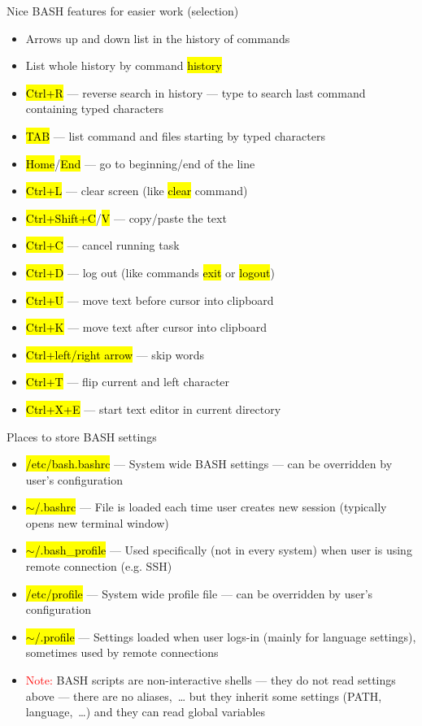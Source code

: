 \documentclass[compress, ucs, xelatex, 11pt, xcolor=svgnames,
  hyperref={
    bookmarks=true,
    unicode=true,
    colorlinks=true,
    pdftitle={Linux, command line and MetaCentrum},
    plainpages=false,
    pdfauthor={Vojtech Zeisek},
    pdfsubject={Course about use of Linux command line, writing shell scripts and using MetaCentrum of CESNET},
    pdfcreator={XeLaTeX},
    pdfkeywords={Linux, GNU, BASH, shell, command line, MetaCentrum},
    linkcolor=DarkRed,
    anchorcolor=DarkBlue,
    citecolor=Indigo,
    filecolor=NavyBlue,
    menucolor=DarkMagenta,
    urlcolor=DarkBlue,
    pdftex},
  url={hyphens, lowtilde} %
  ]{beamer}
\renewcommand{\texttt}[1]{\hl{\ttfamily #1}}
\renewcommand{\alert}[1]{\textcolor{red}{#1}}
\begin{document}
\begin{frame}{Nice BASH features for easier work (selection)}
  \begin{itemize}
    \item Arrows up and down list in the history of commands
    \item List whole history by command \texttt{history}
    \item \texttt{Ctrl+R} --- reverse search in history --- type to search last command containing typed characters
    \item \texttt{TAB} --- list command and files starting by typed characters
    \item \texttt{Home}/\texttt{End} --- go to beginning/end of the line
    \item \texttt{Ctrl+L} --- clear screen (like \texttt{clear} command)
    \item \texttt{Ctrl+Shift+C}/\texttt{V} --- copy/paste the text
    \item \texttt{Ctrl+C} --- cancel running task
    \item \texttt{Ctrl+D} --- log out (like commands \texttt{exit} or \texttt{logout})
    \item \texttt{Ctrl+U} --- move text before cursor into clipboard
    \item \texttt{Ctrl+K} --- move text after cursor into clipboard
    \item \texttt{Ctrl+left/right arrow} --- skip words
    \item \texttt{Ctrl+T} --- flip current and left character
    \item \texttt{Ctrl+X+E} --- start text editor in current directory
  \end{itemize}
\end{frame}

\begin{frame}{Places to store BASH settings}
  \begin{itemize}
    \item \texttt{/etc/bash.bashrc} --- System wide BASH settings --- can be overridden by user's configuration
    \item \texttt{$\sim$/.bashrc} --- File is loaded each time user creates new session (typically opens new terminal window)
    \item \texttt{$\sim$/.bash\_profile} --- Used specifically (not in every system) when user is using remote connection (e.g. SSH)
    \item \texttt{/etc/profile} --- System wide profile file --- can be overridden by user's configuration
    \item \texttt{$\sim$/.profile} --- Settings loaded when user logs-in (mainly for language settings), sometimes used by remote connections
    \item \alert{Note:} BASH scripts are non-interactive shells --- they do not read settings above --- there are no aliases,~\ldots{ }but they inherit some settings (PATH, language,~\ldots) and they can read global variables
  \end{itemize}
\end{frame}
\end{document}
